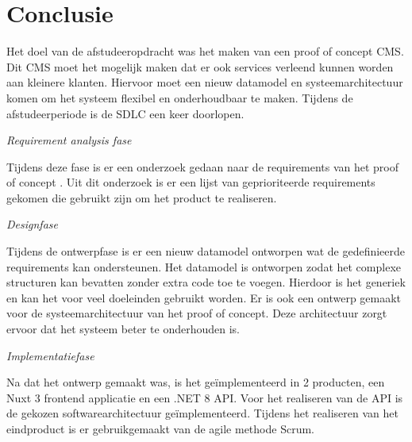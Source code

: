 \chapter{Conclusie}
Het doel van de afstudeeropdracht was het maken van een proof of concept \gls{CMS}.
Dit \gls{CMS} moet het mogelijk maken dat er ook services verleend kunnen worden aan kleinere klanten.
Hiervoor moet een nieuw datamodel en systeemarchitectuur komen om het systeem flexibel en onderhoudbaar te maken.
Tijdens de afstudeerperiode is de \gls{SDLC} een keer doorlopen.




\begin{center}
\textit{Requirement analysis fase}
\end{center}

\whitespace
Tijdens deze fase is er een onderzoek gedaan naar de requirements van het proof of concept \Parencite{DanteOnderzoek}.
Uit dit onderzoek is er een lijst van geprioriteerde requirements gekomen die gebruikt zijn om het product te realiseren.

\begin{center}
\textit{Designfase}
\end{center}

\whitespace
Tijdens de ontwerpfase is er een nieuw datamodel ontworpen wat de gedefinieerde requirements kan ondersteunen.
Het datamodel is ontworpen zodat het complexe structuren kan bevatten zonder extra code toe te voegen.
Hierdoor is het generiek en kan het voor veel doeleinden gebruikt worden.
Er is ook een ontwerp gemaakt voor de systeemarchitectuur van het proof of concept.
Deze architectuur zorgt ervoor dat het systeem beter te onderhouden is.

\begin{center}
\textit{Implementatiefase}
\end{center}

\whitespace
Na dat het ontwerp gemaakt was, is het geïmplementeerd in 2 producten, een Nuxt 3 frontend applicatie en een .NET 8 API.
Voor het realiseren van de API is de gekozen softwarearchitectuur geïmplementeerd.
Tijdens het realiseren van het eindproduct is er gebruikgemaakt van de agile methode Scrum.

